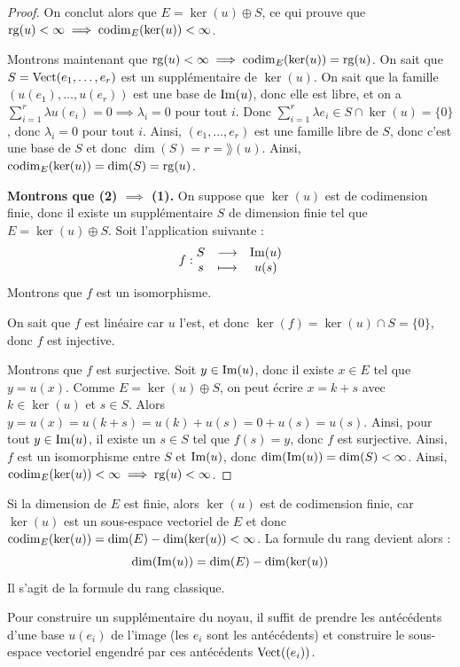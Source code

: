 \documentclass[11pt,a4paper]{report}
\begin{document}
\begin{proof}
    On conclut alors que $E = \ker(u) \oplus S$, ce qui prouve que $\mathrm{rg}(u) < \infty \implies \mathrm{codim}_E(\ker(u)) < \infty$.

    Montrons maintenant que $\mathrm{rg}(u) < \infty \implies \mathrm{codim}_E(\ker(u)) = \mathrm{rg}(u)$. On sait que $S = \mathrm{Vect}(e_1,\dots,e_r)$ est un supplémentaire de $\ker(u)$. On sait que la famille $(u(e_1),\dots,u(e_r))$ est une base de $\mathrm{Im}(u)$, donc elle est libre, et on a $\sum_{i=1}^r \lambda u(e_i) = 0 \implies \lambda_i = 0$ pour tout $i$. Donc $\sum_{i=1}^r \lambda e_i \in S \cap \ker(u) = \{0\}$, donc $\lambda_i = 0$ pour tout $i$. Ainsi, $(e_1,\dots,e_r)$ est une famille libre de $S$, donc c'est une base de $S$ et donc $\dim(S) = r = \rang(u)$. Ainsi, $\mathrm{codim}_E(\ker(u)) = \dim(S) = \mathrm{rg}(u)$.

    \textbf{Montrons que (2) $\implies$ (1).} On suppose que $\ker(u)$ est de codimension finie, donc il existe un supplémentaire $S$ de dimension finie tel que $E = \ker(u) \oplus S$. Soit l'application suivante :
    $$f : \begin{matrix} S & \longrightarrow & \mathrm{Im}(u) \\ s & \longmapsto & u(s) \end{matrix}$$
    Montrons que $f$ est un isomorphisme.
    
    On sait que $f$ est linéaire car $u$ l'est, et donc $\ker(f) = \ker(u) \cap S = \{0\}$, donc $f$ est injective.
    
    Montrons que $f$ est surjective. Soit $y \in \mathrm{Im}(u)$, donc il existe $x \in E$ tel que $y = u(x)$. Comme $E = \ker(u) \oplus S$, on peut écrire $x = k + s$ avec $k \in \ker(u)$ et $s \in S$. Alors $y = u(x) = u(k + s) = u(k) + u(s) = 0 + u(s) = u(s)$. Ainsi, pour tout $y \in \mathrm{Im}(u)$, il existe un $s \in S$ tel que $f(s) = y$, donc $f$ est surjective. Ainsi, $f$ est un isomorphisme entre $S$ et $\mathrm{Im}(u)$, donc $\dim(\mathrm{Im}(u)) = \dim(S) < \infty$. Ainsi, $\mathrm{codim}_E(\ker(u)) < \infty \implies \mathrm{rg}(u) < \infty$.
\end{proof}

\begin{remark}
    Si la dimension de $E$ est finie, alors $\ker(u)$ est de codimension finie, car $\ker(u)$ est un sous-espace vectoriel de $E$ et donc $\mathrm{codim}_E(\ker(u)) = \dim(E) - \dim(\ker(u)) < \infty$. La formule du rang devient alors :
    $$\dim(\mathrm{Im}(u)) = \dim(E) - \dim(\ker(u))$$
    Il s'agit de la formule du rang classique.
\end{remark}

\begin{methodbox}
    Pour construire un supplémentaire du noyau, il suffit de prendre les antécédents d'une base $u(e_i)$ de l'image (les $e_i$ sont les antécédents) et construire le sous-espace vectoriel engendré par ces antécédents $\mathrm{Vect}((e_i))$.
\end{methodbox}
\end{document}

